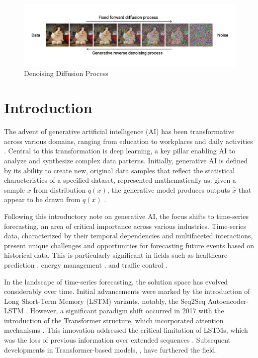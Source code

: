\begin{figure}
    \centering
    \includegraphics[width=\textwidth]{00_images/diffusion.png}
    \caption{Denoising Diffusion Process \cite{vahdat_improving_2022}}
    \label{fig:denoising_diffusion_process}
\end{figure}

\section{Introduction}
The advent of generative artificial intelligence (AI) has been transformative across various domains, ranging from education \cite{baidoo-anu_education_2023, qadir_engineering_2023, lim_generative_2023} to workplaces \cite{noy_experimental_2023, brynjolfsson_generative_2023} and daily activities \cite{dwivedi_opinion_2023}. Central to this transformation is deep learning, a key pillar enabling AI to analyze and synthesize complex data patterns. Initially, generative AI is defined by its ability to create new, original data samples that reflect the statistical characteristics of a specified dataset, represented mathematically as: given a sample $x$ from distribution $q(x)$, the generative model produces outputs $\hat{x}$ that appear to be drawn from $q(x)$ \cite{luo_understanding_2022}.

Following this introductory note on generative AI, the focus shifts to time-series forecasting, an area of critical importance across various industries. Time-series data, characterized by their temporal dependencies and multifaceted interactions, present unique challenges and opportunities for forecasting future events based on historical data. This is particularly significant in fields such as healthcare prediction \cite{penfold_use_2013, bui_time_2018, che_recurrent_2018, kaushik_ai_2020, chimmula_time_2020, zeroual_deep_2020}, energy management \cite{deb_review_2017, chou_forecasting_2018, wang_diffload_2023}, and traffic control \cite{lippi_short-term_2013, pavlyuk_short-term_2017}.

In the landscape of time-series forecasting, the solution space has evolved considerably over time. Initial advancements were marked by the introduction of Long Short-Term Memory (LSTM) variants, notably, the Seq2Seq Autoencoder-LSTM \cite{sutskever_sequence_2014}. However, a significant paradigm shift occurred in 2017 with the introduction of the Transformer structure, which incorporated attention mechanisms \cite{vaswani_attention_2017}. This innovation addressed the critical limitation of LSTMs, which was the loss of previous information over extended sequences \cite{murray_state---art_2023}. Subsequent developments in Transformer-based models, \cite{nguyen_temporal_2021, zhou_informer_2021, wu_autoformer_2022, zhou_fedformer_2022, zhang_crossformer_2022, nie_time_2023}, have furthered the field. 

